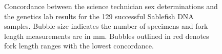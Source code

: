 \documentclass[12pt]{article}\usepackage[]{graphicx}\usepackage[]{color}
\begin{document}
\begin{figure}[htb]

 \hfill{}

\caption{Concordance between the science technician sex determinations and the genetics lab results for the 129 successful Sablefish DNA samples. Bubble size indicates the number of specimens and fork length measurements are in mm. Bubbles outlined in red denotes fork length ranges with the lowest concordance.}\label{fig:figure4}
\end{figure}
\end{document}

